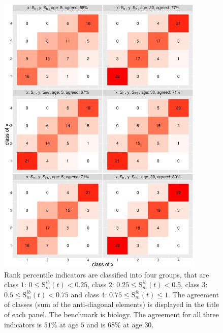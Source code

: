 \begin{refsection}
\begin{figure}[ht!]
    \centering
    \includegraphics[width=0.88\textwidth]{figures/compare_autrp/heatmap_class_agreement.eps}
    \caption[The agreement of rank percentile indicators for scholars]{Rank percentile indicators are classified into four groups, that are class $1$: $0 \le \text{S}_m^{ib}(t) < 0.25$, class $2$: $0.25 \le \text{S}_m^{ib}(t) < 0.5$, class $3$: $0.5 \le \text{S}_m^{ib}(t) < 0.75$ and class $4$: $0.75 \le \text{S}_m^{ib}(t) \le 1$. The agreement of classes (sum of the anti-diagonal elements) is displayed in the title of each panel. The benchmark is biology. The agreement for all three indicators is $51 \%$ at age $5$ and is $68 \%$ at age $30$.}
    \label{fig:aut_rp_class}
\end{figure}


\end{refsection}
